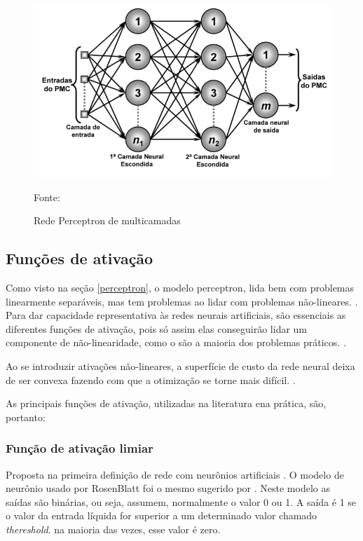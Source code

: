 \begin{figure}[h!]
	\centering
	\includegraphics[width=.7\textwidth]{imagens/pmc.png}	
	\caption{Rede Perceptron de multicamadas}
	{\scriptsize 	Fonte: \cite[p. 92]{silva_redes_2016}}
	\label{fig:pmc}
\end{figure}

\subsection{Funções de ativação}\label{funcoes_ativacao}
Como visto na seção \ref{perceptron}, o modelo perceptron, lida bem com problemas linearmente separáveis, mas tem problemas ao lidar com problemas  não-lineares. \cite{haykin_redes_2001}. Para dar capacidade representativa às redes neurais artificiais, são essenciais as diferentes funções de ativação, pois só assim elas conseguirão lidar um componente de não-linearidade, como o são a maioria dos problemas práticos. \cite{hagan_neural_1996}.

Ao se introduzir ativações não-lineares, a superfície de custo da rede neural deixa de ser convexa fazendo com que a otimização se torne mais difícil. \cite{minsky_perceptrons:_1969} \cite{haykin_redes_2001}.

As principais funções de ativação, utilizadas na literatura ena prática, são, portanto:

\subsubsection{Função de ativação limiar}\label{ativacao:limiar}
Proposta na primeira definição de rede com neurônios artificiais \cite{rosenblatt_perceptron:_1958}. O modelo de neurônio usado por RosenBlatt foi o mesmo sugerido por \cite{mcculloch_logical_1943}. Neste modelo as saídas são binárias, ou seja, assumem, normalmente o valor 0 ou 1. A saída é 1 se o valor da entrada líquida for superior a um determinado valor chamado \textit{thereshold}. na maioria das vezes, esse valor é zero.

